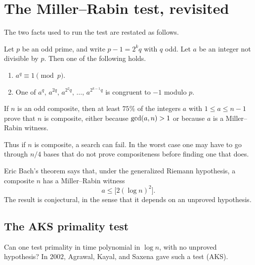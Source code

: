 \section{The Miller--Rabin test, revisited}

The two facts used to run the test are restated as follows.

\begin{theorem}
Let \(p\) be an odd prime, and write \(p-1=2^{k}q\) with \(q\) odd. Let \(a\) be an integer not divisible by \(p\). Then one of the following holds.
\begin{enumerate}[label=\textup{(\roman*)}, leftmargin=1.6em]
    \item \(a^{q}\equiv 1\pmod{p}\).
    \item One of \(a^{q},\, a^{2q},\, a^{2^{2}q},\, \ldots,\, a^{2^{k-1}q}\) is congruent to \(-1\) modulo \(p\).
\end{enumerate}
\end{theorem}

\begin{theorem}
If \(n\) is an odd composite, then at least \(75\%\) of the integers \(a\) with \(1\le a\le n-1\) prove that \(n\) is composite, either because \(\operatorname{gcd}(a,n)>1\) or because \(a\) is a Miller--Rabin witness.
\end{theorem}

Thus if \(n\) is composite, a search can fail. In the worst case one may have to go through \(n/4\) bases that do not prove compositeness before finding one that does.

Eric Bach's theorem says that, under the generalized Riemann hypothesis, a composite \(n\) has a Miller--Rabin witness
\[
    a\le \bigl[2(\log n)^{2}\bigr].
\]
The result is conjectural, in the sense that it depends on an unproved hypothesis.

\subsection{The AKS primality test}
Can one test primality in time polynomial in \(\log n\), with no unproved hypothesis? In \(2002\), Agrawal, Kayal, and Saxena gave such a test (AKS).

